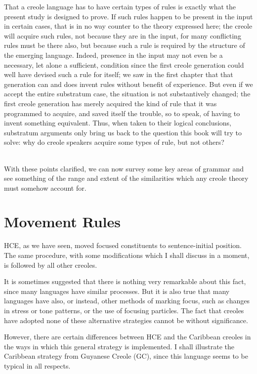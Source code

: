 That a creole language has to have certain types of rules is
exactly what the present study is designed to prove. If such rules happen to be present in the input in certain cases, that is in no way counter to the theory expressed here; the creole will acquire such rules, not because they are in the input, for many conflicting rules must be there also, but because such a rule is required by the struc\-ture of the emerging language. Indeed, presence in the input may not even be a necessary, let alone a sufficient, condition since the first creole generation could well have devised such a rule for itself; we saw in the first chapter that that generation can and does invent rules without benefit of experience. But even if we accept the entire sub\-stratum case, the situation is not substantively changed; the first creole generation has merely acquired the kind of rule that it was programmed to acquire, and saved itself the trouble, so to speak, of having to invent something equivalent. Thus, when taken to their logical conclusions, substratum arguments only bring us back to the question this book will try to solve: why do creole speakers acquire some types of rule, but not others?\\\\

With these points clarified, we can now survey some key areas of grammar and see something of the range and extent of the similarities which any creole theory must somehow account for.

\section{Movement Rules}

HCE, as we have seen, moved focused constituents to sentence-initial position. The same procedure, with some modifications which I shall discuss in a moment, is followed by all other creoles.

It is sometimes suggested that there is nothing very remarkable about this fact, since many languages have similar processes. But it is also true that many languages have also, or instead, other methods of marking focus, such as changes in stress or tone patterns, or the use of focusing particles. The fact that creoles have adopted none of these alternative strategies cannot be without significance.


However, there are certain differences between HCE and the Caribbean creoles in the ways in which this general strategy is imple\-mented. I shall illustrate the Caribbean strategy from Guyanese Creole (GC), since this language seems to be typical in all respects.

